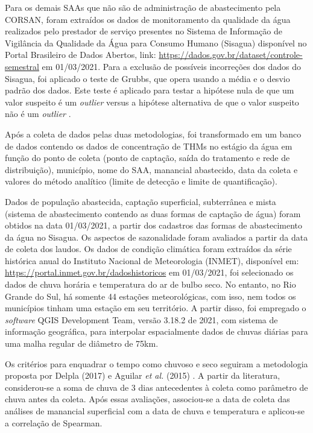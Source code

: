Para os demais SAAs que não são de administração de abastecimento pela CORSAN, foram extraídos os dados de monitoramento da qualidade da água realizados pelo prestador de serviço presentes no Sistema de Informação de Vigilância da Qualidade da Água para Consumo Humano (Sisagua) disponível no Portal Brasileiro de Dados Abertos, link: \url{https://dados.gov.br/dataset/controle-semestral} em 01/03/2021. Para a exclusão de possíveis incorreções dos dados do Sisagua, foi aplicado o teste de Grubbs, que opera usando a média e o desvio padrão dos dados. Este teste é aplicado para testar a hipótese nula de que um valor suspeito é um \textit{outlier} versus a hipótese alternativa de que o valor suspeito não é um \textit{outlier} \cite{testet}.


Após a coleta de dados pelas duas metodologias, foi transformado em um banco de dados contendo os dados de concentração de THMs no estágio da água em função do ponto de coleta (ponto de captação, saída do tratamento e rede de distribuição), município, nome do SAA, manancial abastecido, data da coleta e valores do método analítico (limite de detecção e limite de quantificação). 

Dados de população abastecida, captação superficial, subterrânea e mista (sistema de abastecimento contendo as duas formas de captação de água) foram obtidos na data 01/03/2021, a partir dos cadastros das formas de abastecimento da água no Sisagua.
Os aspectos de sazonalidade foram avaliados a partir da data de coleta dos laudos. Os dados de condição climática foram extraídos da série histórica anual do Instituto Nacional de Meteorologia (INMET), disponível em: \url{https://portal.inmet.gov.br/dadoshistoricos} em 01/03/2021, foi selecionado os dados de chuva horária e temperatura do ar de bulbo seco. No entanto, no Rio Grande do Sul, há somente 44 estações meteorológicas, com isso, nem todos os municípios tinham uma estação em seu território. A partir disso, foi empregado o \textit{software} QGIS Development Team, versão 3.18.2 de 2021, com sistema de informação geográfica, para interpolar espacialmente dados de chuvas diárias para uma malha regular de diâmetro de 75km.  



Os critérios para enquadrar o tempo como chuvoso e seco seguiram a metodologia proposta por Delpla (2017) e Aguilar \textit{et al.} (2015)  \cite{chuva,chuva2}. A partir da literatura, considerou-se a soma de chuva de 3 dias antecedentes à coleta como parâmetro de chuva antes da coleta. Após essas avaliações, associou-se a data de coleta das análises de manancial superficial com a data de chuva e temperatura e aplicou-se a correlação de Spearman.

